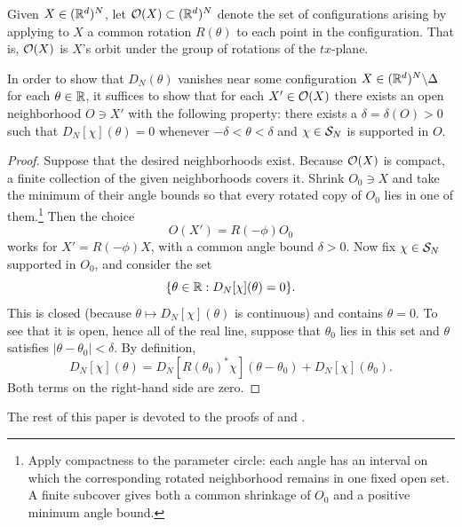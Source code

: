 Given $X\in (\mathbb{R}^d)^N$, let $\mathcal{O}(X)\subset (\mathbb{R}^d)^N$ denote the set of configurations arising by applying to $X$ a common rotation $R(\theta)$ to each point in the configuration. That is, $\mathcal{O}(X)$ is $X$'s orbit under the group of rotations of the $tx$-plane.
\begin{lemma}\label{lem:small_angle}
     In order to show that $D_N(\theta)$ vanishes near some configuration $X\in (\mathbb{R}^d)^N\backslash \Delta$ for each $\theta\in \mathbb{R}$, it suffices to show that for each $X'\in \mathcal{O}(X)$ there exists an open neighborhood $O\ni X'$ with the following property:  there exists a $\delta=\delta(O)>0$ such that $D_N[\chi](\theta)=0$ whenever $-\delta<\theta<\delta$ and $\chi \in \mathcal{S}_N$ is supported in $O$. 
\end{lemma}
\begin{proof}
    Suppose that the desired neighborhoods exist. Because $\mathcal{O}(X)$ is compact, a finite collection of the given neighborhoods covers it. Shrink $O_0\ni X$ and take the minimum of their angle bounds so that every rotated copy of $O_0$ lies in one of them.\footnote{Apply compactness to the parameter circle: each angle has an interval on which the corresponding rotated neighborhood remains in one fixed open set. A finite subcover gives both a common shrinkage of $O_0$ and a positive minimum angle bound.} Then the choice 
    \begin{equation} 
    O(X') = R(-\phi) O_0
    \end{equation} 
    works for $X'=R(-\phi)X$, with a common angle bound $\delta>0$.
    Now fix $\chi\in \mathcal{S}_N$ supported in $O_0$, and consider the set 
    \begin{equation}
        \{\theta\in \mathbb{R}: D_N[\chi](\theta)=0\}.
    \end{equation}
    This is closed (because $\theta\mapsto D_N[\chi](\theta)$ is continuous) and contains $\theta=0$. 
    To see that it is open, hence all of the real line, suppose that $\theta_0$ lies in this set and $\theta$ satisfies $|\theta-\theta_0|<\delta$. By definition, 
    \begin{equation}
        D_N[\chi](\theta) = D_N[R(\theta_0)^* \chi ](\theta-\theta_0) + D_N[\chi](\theta_0).
    \end{equation}
    Both terms on the right-hand side are zero.
\end{proof}



The rest of this paper is devoted to the proofs of  and .


